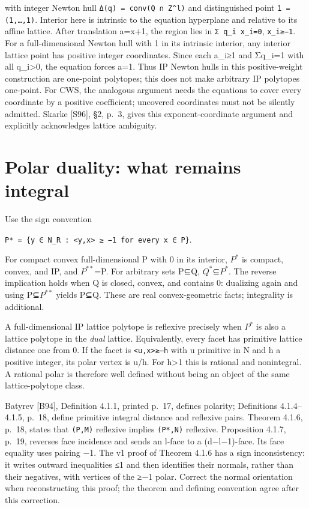 \documentclass[11pt,a4paper,oneside]{report}
\begin{document}
with integer Newton hull
\texttt{Δ(\allowbreak{}q)\allowbreak{} =\allowbreak{} conv(\allowbreak{}Q ∩ Z\textasciicircum{}l)}
and distinguished point
\texttt{1 =\allowbreak{} (\allowbreak{}1,\allowbreak{}…,\allowbreak{}1)}.
Interior here is intrinsic to the equation hyperplane and relative to
its affine lattice. After translation a=x+1, the region lies in
\texttt{Σ q\_\allowbreak{}i x\_\allowbreak{}i=\allowbreak{}0},
\texttt{x\_\allowbreak{}i≥−1}. For a full-dimensional Newton hull with 1
in its intrinsic interior, any interior lattice point has positive
integer coordinates. Since each a\_i≥1 and Σq\_i=1 with all
q\_i\textgreater0, the equation forces a=1. Thus IP Newton hulls in this
positive-weight construction are one-point polytopes; this does not make
arbitrary IP polytopes one-point. For CWS, the analogous argument needs
the equations to cover every coordinate by a positive coefficient;
uncovered coordinates must not be silently admitted. Skarke {[}S96{]},
§2, p.~3, gives this exponent-coordinate argument and explicitly
acknowledges lattice ambiguity.

\section{Polar duality: what remains
integral}\label{ip-reflexivity-and-pyramids--polar-duality-what-remains-integral}

Use the sign convention

\texttt{P* =\allowbreak{} \{y ∈ N\_\allowbreak{}R :\allowbreak{} <y,\allowbreak{}x> ≥ −1 for every x ∈ P\}}.

For compact convex full-dimensional P with 0 in its interior, \(P^{*}\)
is compact, convex, and IP, and \(P^{**}\)=P. For arbitrary sets P⊆Q,
\(Q^{*}\)⊆\(P^{*}\). The reverse implication holds when Q is closed,
convex, and contains 0: dualizing again and using P⊆\(P^{**}\) yields
P⊆Q. These are real convex-geometric facts; integrality is additional.

A full-dimensional IP lattice polytope is reflexive precisely when
\(P^{*}\) is also a lattice polytope in the \emph{dual} lattice.
Equivalently, every facet has primitive lattice distance one from 0. If
the facet is \texttt{<u,\allowbreak{}x>≥−h} with u primitive in N and h
a positive integer, its polar vertex is u/h. For h\textgreater1 this is
rational and nonintegral. A rational polar is therefore well defined
without being an object of the same lattice-polytope class.

Batyrev {[}B94{]}, Definition 4.1.1, printed p.~17, defines polarity;
Definitions 4.1.4--4.1.5, p.~18, define primitive integral distance and
reflexive pairs. Theorem 4.1.6, p.~18, states that
\texttt{(\allowbreak{}P,\allowbreak{}M)} reflexive implies
\texttt{(\allowbreak{}P*,\allowbreak{}N)} reflexive. Proposition 4.1.7,
p.~19, reverses face incidence and sends an l-face to a (d−l−1)-face.
Its face equality uses pairing −1. The v1 proof of Theorem 4.1.6 has a
sign inconsistency: it writes outward inequalities ≤1 and then
identifies their normals, rather than their negatives, with vertices of
the ≥−1 polar. Correct the normal orientation when reconstructing this
proof; the theorem and defining convention agree after this correction.
\end{document}
